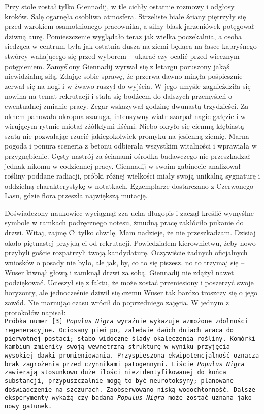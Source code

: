 \documentclass[../MAIN.tex]{subfiles}
\begin{document}
Przy stole został tylko Giennadij, w tle cichły ostatnie rozmowy i odgłosy kroków. Salę ogarnęła osobliwa atmosfera. Strzeliste białe ściany piętrzyły się przed wzrokiem osamotnionego pracownika, a silny blask jarzeniówek potęgował dziwną aurę. Pomieszczenie wyglądało teraz jak wielka poczekalnia, a osoba siedząca w centrum była jak ostatnia dusza na ziemi będąca na łasce kapryśnego stwórcy wahającego się przed wyborem -- ukarać czy ocalić przed wiecznym potępieniem. Zamyślony Giennadij wyrwał się z letargu poruszony jakąś niewidzialną siłą. Zdając sobie sprawę, że przerwa dawno minęła pośpiesznie zerwał się na nogi i w żwawo ruszył do wyjścia. W jego umyśle zagnieździła się nowina na temat rekrutacji i stała się bodźcem do dalszych przemyśleń o ewentualnej zmianie pracy. Zegar wskazywał godzinę dwunastą trzydzieści.
%
\vfil
{}  
% 
Za oknem panowała okropna szaruga, intensywny wiatr szarpał nagie gałęzie i w wirującym rytmie miotał zżółkłymi liśćmi. Niebo okryło się ciemną kłębiastą szatą nie pozwalając rzucić jakiegokolwiek promyku na jesienną ziemię. Marna pogoda i ponura sceneria z betonu odbierała wszystkim witalności i wprawiała w przygnębienie. Gęsty nastrój za ścianami ośrodka badawczego nie przeszkadzał jednak nikomu w codziennej pracy. Giennadij w swoim gabinecie analizował rośliny poddane radiacji, próbki różnej wielkości miały swoją unikalną sygnaturę i oddzielną charakterystykę w notatkach. Egzemplarze dostarczano z Czerwonego Lasu, gdzie flora przeszła największą mutację. 

Doświadczony naukowiec wyciągnął zza ucha długopis i zaczął kreślić wymyślne symbole w ramkach podręcznego notesu, żmudną pracę zakłóciło pukanie do drzwi. 
\sx Witaj, zajmę Ci tylko chwilę. Mam nadzieje, że nie przeszkadzam. Dzisiaj około piętnastej przyjdą ci od rekrutacji. Powiedziałem kierownictwu, żeby nowo przybyli goście rozpatrzyli twoją kandydaturę. Oczywiście żadnych oficjalnych wniosków o posady nie było, ale jak, by, co to się piszesz, no to trzymaj się -- Wuser kiwnął głową i zamknął drzwi za sobą.
\qd
Giennadij nie zdążył nawet podziękować. Ucieszył się z faktu, że może zostać przeniesiony i poszerzyć swoje horyzonty, ale jednocześnie dziwił się czemu Wuser tak bardzo troszczy się o jego zawód. Nie marnując czasu wrócił do poprzedniego zajęcia. W jednym z protokołów napisał:\\
% 
\texttt{Próbka numer [3] \textit{Populus Nigra} wyraźnie wykazuje wzmożone zdolności regeneracyjne. Ociosany pień po, zaledwie dwóch dniach wraca do pierwotnej postaci; słabo widoczne ślady okaleczenia rośliny. Komórki kambium zmieniły swoją wewnętrzną strukturę w wyniku przyjęcia wysokiej dawki promieniowania. Przyspieszona ekwipotencjalność oznacza brak zagrożenia przed czynnikami patogennymi. Liście \textit{Populus Nigra} zawierają stosunkowo duże ilości niezidentyfikowanej do końca substancji, przypuszczalnie mogą to być neurotoksyny; planowane doświadczenie na szczurach. Zaobserwowano niską wodochłonność. Dalsze eksperymenty wykażą czy badana \textit{Populus Nigra} może zostać uznana jako nowy gatunek.} 
\end{document}
